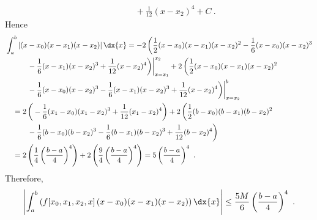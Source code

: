 {\begin{align*}
&\quad \qquad + \frac{1}{12}(x-x_2)^4 + C \ .
\end{align*}
Hence
\begin{align*}
&\int_a^b \left|(x-x_0)(x-x_1)(x-x_2) \right|\dx{x}
= - 2\, \bigg( \frac{1}{2}(x-x_0)(x-x_1)(x-x_2)^2 -
\frac{1}{6}(x-x_0)(x-x_2)^3 \\
&\quad \qquad - \frac{1}{6}(x-x_1)(x-x_2)^3
+ \frac{1}{12}(x-x_2)^4 \bigg)\bigg|_{x=x_1}^{x_2}
+2\, \bigg( \frac{1}{2}(x-x_0)(x-x_1)(x-x_2)^2 \\
&\quad \qquad - \frac{1}{6}(x-x_0)(x-x_2)^3
- \frac{1}{6}(x-x_1)(x-x_2)^3
+ \frac{1}{12}(x-x_2)^4 \bigg)\bigg|_{x=x_2}^b \\
&\quad =  2\, \bigg( -\frac{1}{6}(x_1-x_0)(x_1-x_2)^3
+ \frac{1}{12}(x_1-x_2)^4 \bigg)
+2\, \bigg( \frac{1}{2}(b-x_0)(b-x_1)(b-x_2)^2  \\
&\quad\qquad  - \frac{1}{6}(b-x_0)(b-x_2)^3
- \frac{1}{6}(b-x_1)(b-x_2)^3 + \frac{1}{12}(b-x_2)^4 \bigg) \\
&\quad =  2\left( \frac{1}{4} \left(\frac{b-a}{4}\right)^4 \right)
  +2 \left( \frac{9}{4} \left(\frac{b-a}{4}\right)^4 \right)
=  5 \left(\frac{b-a}{4}\right)^4  \ .
\end{align*}
Therefore,
\[
\left| \int_a^b \left(f[x_0,x_1,x_2,x]\,(x-x_0)(x-x_1)(x-x_2)
  \right)\dx{x} \right| \leq \frac{5 M}{6} \left(\frac{b-a}{4}\right)^4 \ .
\]
}

